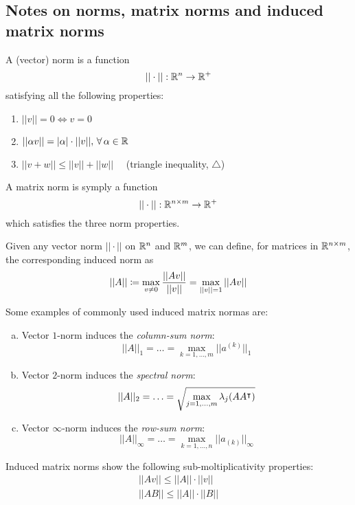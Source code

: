 \subsection[Notes on norms]{Notes on norms, matrix norms and induced matrix norms}
\begin{Def}[Norm]
	A (vector) norm is a function
	\begin{equation*}
		||\cdot|| : \mathbb{R}^n \to \mathbb{R}^+
	\end{equation*}
	satisfying all the following properties:
	\begin{enumerate}
		\item $||v|| = 0 \iff v = 0$
		\item $||\alpha v|| = |\alpha|\cdot||v||,\,\forall\, \alpha \in \mathbb{R}$
		\item $||v + w|| \leq ||v|| + ||w|| \quad$ (triangle inequality, $\triangle$)
	\end{enumerate}
\end{Def}
\begin{Def}
	A matrix norm is symply a function
	\begin{equation*}
		||\cdot|| : \mathbb{R}^{n \times m} \to \mathbb{R}^+
	\end{equation*}
	which satisfies the three norm properties.
\end{Def}
\begin{Def}
	Given any vector norm $||\cdot||$ on $\mathbb{R}^n$ and $\mathbb{R}^m$, we can define, for matrices in $\mathbb{R}^{n \times m}$, the corresponding induced norm as
	\begin{dmath*}
		||A|| \definedas \max_{v \neq 0} \frac{||Av||}{||v||} = \max_{||v|| = 1} ||Av||
	\end{dmath*}
\end{Def}
\begin{Ex}
Some examples of commonly used induced matrix normas are:
\begin{enumerate}[(a)]
	\item 	Vector $1$-norm induces the \emph{column-sum norm}:
	\begin{dmath*}
		||A||_1 = \ldots = \max_{k=1,\ldots,m} ||a^{(k)}||_1
	\end{dmath*}
	\item 	Vector $2$-norm induces the \emph{spectral norm}:
	\begin{dmath*}
		||A||_2 = \ldots = \sqrt{\max_{j=1,\ldots,m} \lambda_j (AA\t)}
	\end{dmath*}
	\item 	Vector $\infty$-norm induces the \emph{row-sum norm}:
	\begin{dmath*}
		||A||_\infty = \ldots = \max_{k=1,\ldots,n} ||a_{(k)}||_\infty
	\end{dmath*}
\end{enumerate}
\end{Ex}
\begin{Rem}
	Induced matrix norms show the following sub-moltiplicativity properties:
	\begin{align}
		||Av|| \leq ||A||\cdot||v|| \label{prop:indnorm1} \tag{P1}\\
		||AB|| \leq ||A||\cdot||B|| \label{prop:indnorm2}\tag{P2}
	\end{align}
\end{Rem}
